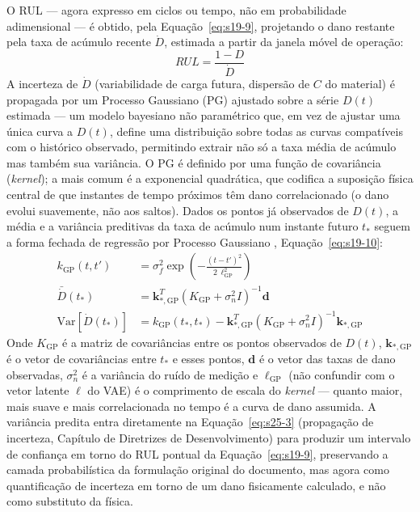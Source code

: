 \documentclass[12pt,a4paper]{article}
\numberwithin{equation}{section}
\numberwithin{table}{section}
\numberwithin{figure}{section}
\begin{document}
{\begin{itemize}
	O RUL — agora expresso em ciclos ou tempo, não em probabilidade adimensional — é obtido, pela Equação~\eqref{eq:s19-9}, projetando o dano restante pela taxa de acúmulo recente $\dot{D}$, estimada a partir da janela móvel de operação:
	\begin{equation}\label{eq:s19-9}
 RUL = \frac{1 - D}{\dot{D}} 
\end{equation}
	A incerteza de $\dot{D}$ (variabilidade de carga futura, dispersão de $C$ do material) é propagada por um Processo Gaussiano (PG) ajustado sobre a série $D(t)$ estimada — um modelo bayesiano não paramétrico que, em vez de ajustar uma única curva a $D(t)$, define uma distribuição sobre todas as curvas compatíveis com o histórico observado, permitindo extrair não só a taxa média de acúmulo mas também sua variância. O PG é definido por uma função de covariância (\textit{kernel}); a mais comum é a exponencial quadrática, que codifica a suposição física central de que instantes de tempo próximos têm dano correlacionado (o dano evolui suavemente, não aos saltos). Dados os pontos já observados de $D(t)$, a média e a variância preditivas da taxa de acúmulo num instante futuro $t_*$ seguem a forma fechada de regressão por Processo Gaussiano \cite{gpml}, Equação~\eqref{eq:s19-10}:
	\begin{equation}\label{eq:s19-10}
	\begin{aligned}
		k_{\text{GP}}(t,t') &= \sigma_f^2 \exp\left( -\frac{(t-t')^2}{2\,\ell_{\text{GP}}^2} \right) \\[6pt]
		\bar{\dot{D}}(t_*) &= \mathbf{k}_{*,\text{GP}}^T \left( K_{\text{GP}} + \sigma_n^2 I \right)^{-1} \mathbf{d} \\[6pt]
		\text{Var}[\dot{D}(t_*)] &= k_{\text{GP}}(t_*,t_*) - \mathbf{k}_{*,\text{GP}}^T \left( K_{\text{GP}} + \sigma_n^2 I \right)^{-1} \mathbf{k}_{*,\text{GP}}
	\end{aligned}
	\end{equation}
	Onde $K_{\text{GP}}$ é a matriz de covariâncias entre os pontos observados de $D(t)$, $\mathbf{k}_{*,\text{GP}}$ é o vetor de covariâncias entre $t_*$ e esses pontos, $\mathbf{d}$ é o vetor das taxas de dano observadas, $\sigma_n^2$ é a variância do ruído de medição e $\ell_{\text{GP}}$ (não confundir com o vetor latente $\ell$ do VAE) é o comprimento de escala do \textit{kernel} — quanto maior, mais suave e mais correlacionada no tempo é a curva de dano assumida. A variância predita entra diretamente na Equação~\eqref{eq:s25-3} (propagação de incerteza, Capítulo de Diretrizes de Desenvolvimento) para produzir um intervalo de confiança em torno do RUL pontual da Equação~\eqref{eq:s19-9}, preservando a camada probabilística da formulação original do documento, mas agora como quantificação de incerteza em torno de um dano fisicamente calculado, e não como substituto da física.
\end{itemize}

}
\end{document}
